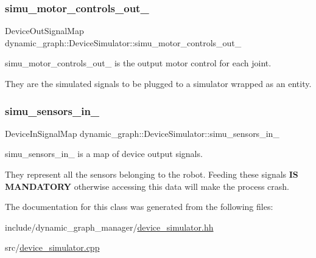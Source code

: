 \subsubsection{\texorpdfstring{simu\+\_\+motor\+\_\+controls\+\_\+out\+\_\+}{simu\_motor\_controls\_out\_}}
{\footnotesize\ttfamily Device\+Out\+Signal\+Map dynamic\+\_\+graph\+::\+Device\+Simulator\+::simu\+\_\+motor\+\_\+controls\+\_\+out\+\_\+}



simu\+\_\+motor\+\_\+controls\+\_\+out\+\_\+ is the output motor control for each joint. 

They are the simulated signals to be plugged to a simulator wrapped as an entity. \mbox{\label{classdynamic__graph_1_1DeviceSimulator_a8640ee078f06fc5f31efcb2b35c9ed99}} 
\subsubsection{\texorpdfstring{simu\+\_\+sensors\+\_\+in\+\_\+}{simu\_sensors\_in\_}}
{\footnotesize\ttfamily Device\+In\+Signal\+Map dynamic\+\_\+graph\+::\+Device\+Simulator\+::simu\+\_\+sensors\+\_\+in\+\_\+}



simu\+\_\+sensors\+\_\+in\+\_\+ is a map of device output signals. 

They represent all the sensors belonging to the robot. Feeding these signals {\bfseries  IS M\+A\+N\+D\+A\+T\+O\+RY } otherwise accessing this data will make the process crash. 

The documentation for this class was generated from the following files\+:\begin{DoxyCompactItemize}
\item 
include/dynamic\+\_\+graph\+\_\+manager/\hyperlink{device__simulator_8hh}{device\+\_\+simulator.\+hh}\item 
src/\hyperlink{device__simulator_8cpp}{device\+\_\+simulator.\+cpp}\end{DoxyCompactItemize}
